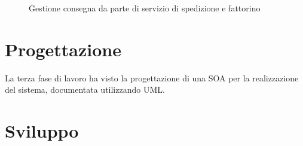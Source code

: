 \documentclass[11pt]{article} %
\begin{document}
\begin{figure}[!ht]
\begin{center}
\caption{Gestione consegna da parte di servizio di spedizione e fattorino}
\end{center}
\end{figure}

\clearpage

\section{Progettazione}
\label{sez:progettazione}

La terza fase di lavoro ha visto la progettazione di una SOA per la realizzazione del sistema, documentata utilizzando UML.

\clearpage

\section{Sviluppo}
\label{sez:sviluppo}
\end{document}
